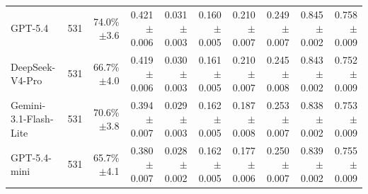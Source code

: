 \begin{table}[t]
\begin{tabular*}{\textwidth}{@{\extracolsep{\fill}}lrrrrrrrrr@{}}
GPT-5.4 & 531 & \shortstack[r]{74.0\%\\{\scriptsize $\pm$3.6}} & \shortstack[r]{0.421\\{\scriptsize $\pm$0.006}} & \shortstack[r]{0.031\\{\scriptsize $\pm$0.003}} & \shortstack[r]{0.160\\{\scriptsize $\pm$0.005}} & \shortstack[r]{0.210\\{\scriptsize $\pm$0.007}} & \shortstack[r]{0.249\\{\scriptsize $\pm$0.007}} & \shortstack[r]{0.845\\{\scriptsize $\pm$0.002}} & \shortstack[r]{0.758\\{\scriptsize $\pm$0.009}} \\
DeepSeek-V4-Pro & 531 & \shortstack[r]{66.7\%\\{\scriptsize $\pm$4.0}} & \shortstack[r]{0.419\\{\scriptsize $\pm$0.006}} & \shortstack[r]{0.030\\{\scriptsize $\pm$0.003}} & \shortstack[r]{0.161\\{\scriptsize $\pm$0.005}} & \shortstack[r]{0.210\\{\scriptsize $\pm$0.007}} & \shortstack[r]{0.245\\{\scriptsize $\pm$0.008}} & \shortstack[r]{0.843\\{\scriptsize $\pm$0.002}} & \shortstack[r]{0.752\\{\scriptsize $\pm$0.009}} \\
Gemini-3.1-Flash-Lite & 531 & \shortstack[r]{70.6\%\\{\scriptsize $\pm$3.8}} & \shortstack[r]{0.394\\{\scriptsize $\pm$0.007}} & \shortstack[r]{0.029\\{\scriptsize $\pm$0.003}} & \shortstack[r]{0.162\\{\scriptsize $\pm$0.005}} & \shortstack[r]{0.187\\{\scriptsize $\pm$0.008}} & \shortstack[r]{0.253\\{\scriptsize $\pm$0.007}} & \shortstack[r]{0.838\\{\scriptsize $\pm$0.002}} & \shortstack[r]{0.753\\{\scriptsize $\pm$0.009}} \\
GPT-5.4-mini & 531 & \shortstack[r]{65.7\%\\{\scriptsize $\pm$4.1}} & \shortstack[r]{0.380\\{\scriptsize $\pm$0.007}} & \shortstack[r]{0.028\\{\scriptsize $\pm$0.002}} & \shortstack[r]{0.162\\{\scriptsize $\pm$0.005}} & \shortstack[r]{0.177\\{\scriptsize $\pm$0.006}} & \shortstack[r]{0.250\\{\scriptsize $\pm$0.007}} & \shortstack[r]{0.839\\{\scriptsize $\pm$0.002}} & \shortstack[r]{0.755\\{\scriptsize $\pm$0.009}} \\

\end{tabular*}
\end{table}
